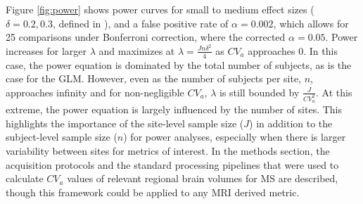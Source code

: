 Figure \ref{fig:power} shows power curves for small to medium effect sizes ($\delta = 0.2, 0.3$, defined in \cite{Raudenbush2000}), and a false positive rate of $\alpha = 0.002$, which allows for 25 comparisons under Bonferroni correction, where the corrected $\alpha = 0.05$. Power increases for larger $\lambda$  and maximizes at $\lambda = \frac{Jn\delta^2}{4}$ as $CV_a$ approaches 0. In this case, the power equation is dominated by the total number of subjects, as is the case for the GLM. However, even as the number of subjects per site, $n$, approaches infinity and for non-negligible $CV_a$, $\lambda$ is still bounded by $\frac{J}{CV_a^2}$. At this extreme, the  power equation is largely influenced by the number of sites. This highlights the importance of the site-level sample size ($J$) in addition to the subject-level sample size ($n$) for power analyses, especially when there is larger variability between sites for metrics of interest. In the methods section, the acquisition protocols and the standard processing pipelines that were used to calculate $CV_a$ values of relevant regional brain volumes for MS are described, though this framework could be applied to any MRI derived metric.